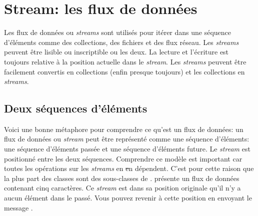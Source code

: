 \documentclass[a4paper,10pt,twoside]{book}
\begin{document}
	\renewcommand{\nnbb}[2]{} %
	\sloppy
\fi
\newcommand{\stream}{\emph{stream}\xspace}
\newcommand{\streams}{\emph{streams}\xspace}
\chapter{Stream: les flux de donn\'ees}\label{cha:streams}

Les flux de donn\'ees ou \streams sont utilis\'es pour it\'erer dans
une s\'equence d'\'el\'ements comme des
collections, des fichiers et des flux r\'eseau.
Les \streams peuvent \^etre lisible ou inscriptible ou les deux.
La lecture et l'\'ecriture est toujours relative \`a la position actuelle
dans le \stream. Les \streams peuvent \^etre facilement convertis en
collections 
(enfin presque toujours)
et les collections en \streams.

\section{Deux s\'equences d'\'el\'ements}
Voici une bonne m\'etaphore pour comprendre ce qu'est un flux de donn\'ees:
un flux de donn\'ees ou \stream peut \^etre repr\'esent\'e comme une
s\'equence d'\'el\'ements: une s\'equence d'\'el\'ements pass\'ee 
et une s\'equence d'\'el\'ements future.
Le \stream est positionn\'e entre les deux s\'equences.
Comprendre ce mod\`ele est important car toutes les op\'erations
sur les \streams en \st en d\'ependent.
C'est pour cette raison que la plus part des
classes  sont des sous-classes de .
 pr\'esente un flux de donn\'ees contenant cinq caract\`eres.
Ce \stream est dans sa position originale \ie qu'il n'y a aucun \'el\'ement
dans le pass\'e. Vous pouvez revenir \`a cette position en envoyant le 
message 
.
\end{document}
